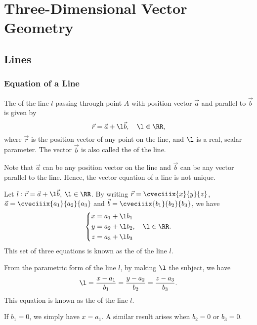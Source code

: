 \chapter{Three-Dimensional Vector Geometry}


\section{Lines}

\subsection{Equation of a Line}

\begin{definition}
    The  of the line $l$ passing through point $A$ with position vector $\vec a$ and parallel to $\vec b$ is given by \[\vec r = \vec a + \l \vec b, \quad \l \in \RR,\] where $\vec r$ is the position vector of any point on the line, and $\l$ is a real, scalar parameter. The vector $\vec b$ is also called the  of the line.
\end{definition}
\begin{remark}
    Note that $\vec a$ can be any position vector on the line and $\vec b$ can be any vector parallel to the line. Hence, the vector equation of a line is not unique.
\end{remark}

\begin{definition}
    Let $l : \vec r = \vec a + \l \vec b$, $\l \in \RR$. By writing $\vec r = \cveciiix{x}{y}{z}$, $\vec a = \cveciiix{a_1}{a_2}{a_3}$ and $\vec b = \cveciiix{b_1}{b_2}{b_3}$, we have \[\left\{ \begin{aligned}
        x = a_1 + \l b_1\\
        y = a_2 + \l b_2\\
        z = a_3 + \l b_3
    \end{aligned}, \quad \l \in \RR. \right.\] This set of three equations is known as the  of the line $l$.
\end{definition}

\begin{definition}
    From the parametric form of the line $l$, by making $\l$ the subject, we have \[\l = \frac{x-a_1}{b_1} = \frac{y - a_2}{b_2} = \frac{z - a_3}{b_3}.\] This equation is known as the  of the line $l$.
\end{definition}
\begin{remark}
    If $b_1 = 0$, we simply have $x = a_1$. A similar result arises when $b_2 = 0$ or $b_3 = 0$.
\end{remark}

